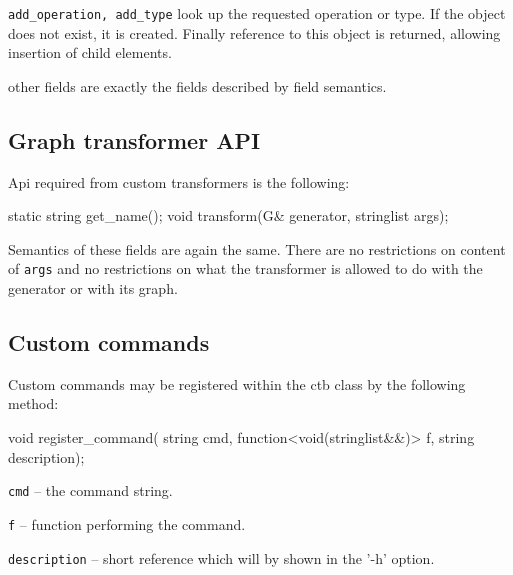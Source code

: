 \begin{description}
  \item \texttt{add\_operation, add\_type} look up the requested operation or type. If the object does not exist, it is created. Finally reference to this object is returned, allowing insertion of child elements.
  \item other fields are exactly the fields described by field semantics.
\end{description}

\subsection{Graph transformer API}

Api required from custom transformers is the following:
\begin{code}
 static string get_name();
 void transform(G& generator, stringlist args);
\end{code}

Semantics of these fields are again the same. There are no restrictions on content of \texttt{args} and no restrictions on what the transformer is allowed to do with the generator or with its graph.


\subsection{Custom commands}

Custom commands may be registered within the ctb class by the following method:
\begin{code}
void register_command( string cmd, function<void(stringlist&&)> f,
  string description);
\end{code}

\begin{description}
\item \texttt{cmd} -- the command string.
\item \texttt{f} -- function performing the command.
\item \texttt{description} -- short reference which will by shown in the '-h' option.
\end{description}

  


